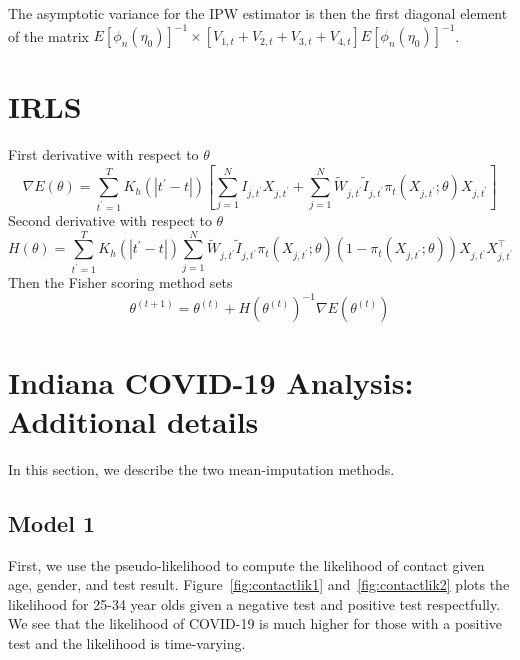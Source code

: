 \documentclass[11pt]{amsart}
\numberwithin{equation}{section}
\theoremstyle{plain}
\begin{document}
The asymptotic variance for the IPW estimator is then the first diagonal element of the matrix $E \left[ \phi_n (\eta_0) \right]^{-1} \times \left[ V_{1,t} + V_{2,t} + V_{3,t} + V_{4,t} \right] E \left[ \phi_n (\eta_0) \right]^{-1}$.
\section{IRLS}

First derivative with respect to $\theta$
$$
\nabla E(\theta) = \sum_{t^\prime=1}^T K_h(|t^\prime - t|) \left[ \sum_{j=1}^N I_{j,t^\prime} X_{j,t^\prime} + \sum_{j=1}^N \tilde W_{j,t^\prime} \tilde I_{j,t^\prime} \pi_t (X_{j,t^\prime}; \theta) X_{j,t^\prime} \right]
$$
Second derivative with respect to $\theta$
$$
H(\theta) = \sum_{t^\prime=1}^T K_h(|t^\prime - t|) \sum_{j=1}^N \tilde W_{j,t^\prime} \tilde I_{j,t^\prime} \pi_t (X_{j,t^\prime}; \theta) \left( 1- \pi_t (X_{j,t^\prime}; \theta) \right) X_{j,t^\prime} X_{j,t^\prime}^\top
$$
Then the Fisher scoring method sets
$$
\theta^{(t+1)} = \theta^{(t)} + H \left(\theta^{(t)} \right)^{-1} \nabla E \left(\theta^{(t)} \right)
$$

\section{Indiana COVID-19 Analysis: Additional details}
\label{app:in_add_details}

In this section, we describe the two mean-imputation methods.
\subsection{Model 1}

First, we use the pseudo-likelihood to compute the likelihood of contact given age, gender, and test result.  Figure~\ref{fig:contactlik1} and~\ref{fig:contactlik2} plots the likelihood for 25-34 year olds given a negative test and positive test respectfully.  We see that the likelihood of COVID-19 is much higher for those with a positive test and the likelihood is time-varying.
\end{document}
